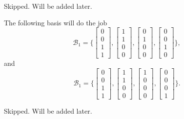 \begin{problem}
	Skipped. Will be added later.
\end{problem}

\begin{problem}
	The following basis will do the job
	\[ \mathcal{B}_1 = \big\{
	\begin{bmatrix}
		0 \\ 0 \\ 1 \\ 1
	\end{bmatrix}, 
	\begin{bmatrix}
		1 \\ 1 \\ 0 \\ 0
	\end{bmatrix}, 
	\begin{bmatrix}
		0 \\ 1 \\ 0 \\ 0
	\end{bmatrix}, 
	\begin{bmatrix}
		0 \\ 0 \\ 1 \\ 0
	\end{bmatrix}
	\big\}, \]
	and 
	\[ \mathcal{B}_1 = \big\{
	\begin{bmatrix}
		0 \\ 0 \\ 1 \\ 1
	\end{bmatrix}, 
	\begin{bmatrix}
		1 \\ 1 \\ 0 \\ 0
	\end{bmatrix}, 
	\begin{bmatrix}
		1 \\ 0 \\ 0 \\ 0
	\end{bmatrix}, 
	\begin{bmatrix}
		0 \\ 0 \\ 0 \\ 1
	\end{bmatrix}
	\big\}. \]
\end{problem}

\begin{problem}
	Skipped. Will be added later.
\end{problem}

